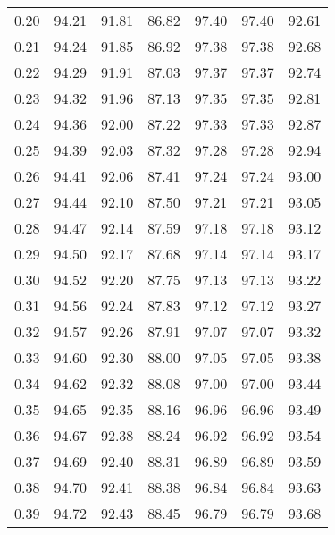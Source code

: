 \begin{tabular}{|c|c|c|c|c|c|c|}
      0.20 &     94.21 &     91.81 &      86.82 &   97.40 &      97.40 &         92.61 \\
      0.21 &     94.24 &     91.85 &      86.92 &   97.38 &      97.38 &         92.68 \\
      0.22 &     94.29 &     91.91 &      87.03 &   97.37 &      97.37 &         92.74 \\
      0.23 &     94.32 &     91.96 &      87.13 &   97.35 &      97.35 &         92.81 \\
      0.24 &     94.36 &     92.00 &      87.22 &   97.33 &      97.33 &         92.87 \\
      0.25 &     94.39 &     92.03 &      87.32 &   97.28 &      97.28 &         92.94 \\
      0.26 &     94.41 &     92.06 &      87.41 &   97.24 &      97.24 &         93.00 \\
      0.27 &     94.44 &     92.10 &      87.50 &   97.21 &      97.21 &         93.05 \\
      0.28 &     94.47 &     92.14 &      87.59 &   97.18 &      97.18 &         93.12 \\
      0.29 &     94.50 &     92.17 &      87.68 &   97.14 &      97.14 &         93.17 \\
      0.30 &     94.52 &     92.20 &      87.75 &   97.13 &      97.13 &         93.22 \\
      0.31 &     94.56 &     92.24 &      87.83 &   97.12 &      97.12 &         93.27 \\
      0.32 &     94.57 &     92.26 &      87.91 &   97.07 &      97.07 &         93.32 \\
      0.33 &     94.60 &     92.30 &      88.00 &   97.05 &      97.05 &         93.38 \\
      0.34 &     94.62 &     92.32 &      88.08 &   97.00 &      97.00 &         93.44 \\
      0.35 &     94.65 &     92.35 &      88.16 &   96.96 &      96.96 &         93.49 \\
      0.36 &     94.67 &     92.38 &      88.24 &   96.92 &      96.92 &         93.54 \\
      0.37 &     94.69 &     92.40 &      88.31 &   96.89 &      96.89 &         93.59 \\
      0.38 &     94.70 &     92.41 &      88.38 &   96.84 &      96.84 &         93.63 \\
      0.39 &     94.72 &     92.43 &      88.45 &   96.79 &      96.79 &         93.68 \\

\end{tabular}
